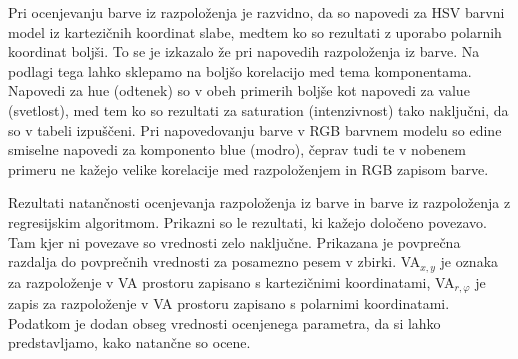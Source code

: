 \documentclass[a4paper, 12pt]{book}
\begin{document}
{Pri ocenjevanju barve iz razpoloženja je razvidno, da so napovedi za HSV barvni model iz kartezičnih koordinat slabe, medtem ko so rezultati z uporabo polarnih koordinat boljši. To se je izkazalo že pri napovedih razpoloženja iz barve. Na podlagi tega lahko sklepamo na boljšo korelacijo med tema komponentama. Napovedi za hue (odtenek) so v obeh primerih boljše kot napovedi za value (svetlost), med tem ko so rezultati za saturation (intenzivnost) tako naključni, da so v tabeli izpuščeni. Pri napovedovanju barve v RGB barvnem modelu so edine smiselne napovedi za komponento blue (modro), čeprav tudi te v nobenem primeru ne kažejo velike korelacije med razpoloženjem in RGB zapisom barve. 

\begin{table}[hbt]
\begin{center}

\caption{Rezultati natančnosti ocenjevanja razpoloženja iz barve in barve iz razpoloženja z regresijskim algoritmom. Prikazni so le rezultati, ki kažejo določeno povezavo. Tam kjer ni povezave so vrednosti zelo naključne. Prikazana je povprečna razdalja do povprečnih vrednosti za posamezno pesem v zbirki. VA$_{x,y}$ je oznaka za razpoloženje v VA prostoru zapisano s kartezičnimi koordinatami, VA$_{r,\varphi}$ je zapis za razpoloženje v VA prostoru zapisano s polarnimi koordinatami. Podatkom je dodan obseg vrednosti ocenjenega parametra, da si lahko predstavljamo, kako natančne so ocene. }


\end{center}
\end{table}}
\end{document}
